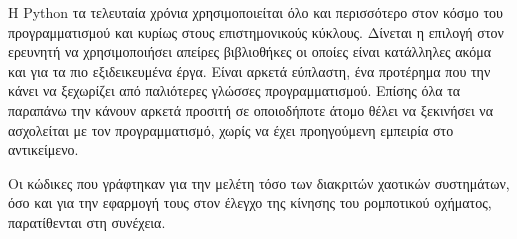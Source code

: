 

Η Python τα τελευταία χρόνια χρησιμοποιείται όλο και περισσότερο στον κόσμο του προγραμματισμού  και κυρίως στους επιστημονικούς κύκλους. Δίνεται η επιλογή στον ερευνητή να χρησιμοποιήσει απείρες βιβλιοθήκες οι οποίες είναι κατάλληλες ακόμα και για τα πιο εξιδεικευμένα έργα. Είναι αρκετά εύπλαστη, ένα προτέρημα που την κάνει να ξεχωρίζει από παλιότερες γλώσσες προγραμματισμού. Επίσης όλα τα παραπάνω την κάνουν αρκετά προσιτή σε οποιοδήποτε άτομο θέλει να ξεκινήσει να ασχολείται με τον προγραμματισμό, χωρίς να έχει προηγούμενη εμπειρία στο αντικείμενο.

Οι κώδικες που γράφτηκαν για την μελέτη τόσο των διακριτών χαοτικών συστημάτων, όσο και για την εφαρμογή τους στον έλεγχο της κίνησης του ρομποτικού οχήματος, παρατίθενται στη συνέχεια.










